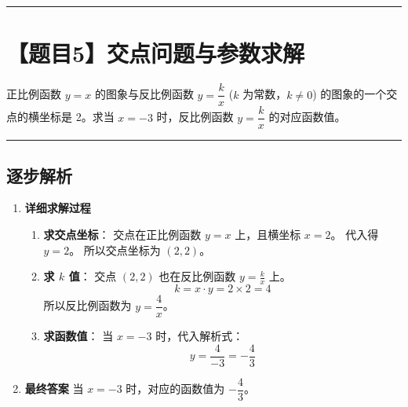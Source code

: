 \documentclass[UTF8]{ctexart}
\newenvironment{redenv}{\color{red}}{}
\newenvironment{detailedanalysis}{%
    \color{red}
    \begin{enumerate}[label=\textbf{第\arabic*步：}, leftmargin=*, align=left, itemsep=1.5ex]
}{%
    \end{enumerate}
}
\newcommand{\problemrule}{\noindent\rule{\textwidth}{1.5pt}\vspace{-0.8em}}
\newcommand{\analysisrule}{\noindent\rule{\textwidth}{0.8pt}\vspace{-0.8em}}
\begin{document}
\problemrule
\section*{【题目5】交点问题与参数求解}
正比例函数 $y=x$ 的图象与反比例函数 $y = \dfrac{k}{x}$ ($k$ 为常数，$k \neq 0$) 的图象的一个交点的横坐标是 2。求当 $x = -3$ 时，反比例函数 $y = \dfrac{k}{x}$ 的对应函数值。

\begin{redenv}
\analysisrule
\subsection*{逐步解析}

\begin{detailedanalysis}
\item \textbf{详细求解过程}
\begin{enumerate}[label=\textbf{Step \arabic*.}]
    \item \textbf{求交点坐标}：
    交点在正比例函数 $y=x$ 上，且横坐标 $x=2$。
    代入得 $y=2$。
    所以交点坐标为 $(2, 2)$。

    \item \textbf{求 $k$ 值}：
    交点 $(2, 2)$ 也在反比例函数 $y = \frac{k}{x}$ 上。
    \[ k = x \cdot y = 2 \times 2 = 4 \]
    所以反比例函数为 $y = \dfrac{4}{x}$。

    \item \textbf{求函数值}：
    当 $x = -3$ 时，代入解析式：
    \[ y = \frac{4}{-3} = -\frac{4}{3} \]
\end{enumerate}

\item \textbf{最终答案}
当 $x = -3$ 时，对应的函数值为 $-\dfrac{4}{3}$。
\end{detailedanalysis}
\end{redenv}
\end{document}
